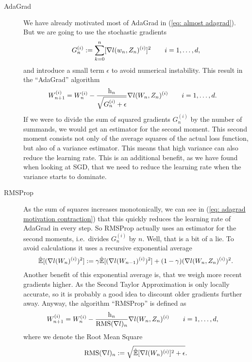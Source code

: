 \begin{description}
	\item[AdaGrad] \parencite{duchiAdaptiveSubgradientMethods2011}
	We have already motivated most of AdaGrad in (\ref{eq: almost adagrad}).
	But we are going to use the stochastic gradients
	\begin{align*}
		G_n^{(i)} := \sum_{k=0}^n [\nabla l(w_n, Z_n)^{(i)}]^2 \qquad i=1,\dots,d,
	\end{align*}
	and introduce a small term \(\epsilon\) \parencite[\(\approx 10^{-8}\)][]{ruderOverviewGradientDescent2017}
	to avoid numerical instability. This result in the ``AdaGrad'' algorithm
	\begin{align*}
		W_{n+1}^{(i)}
		&= W_n^{(i)}
		- \frac{\text{h}_n}{\sqrt{G_n^{(i)}+\epsilon}}\nabla l(W_n, Z_n)^{(i)}
		\qquad i=1,\dots,d.
	\end{align*}
	If we were to divide the sum of squared gradients \(G_n^{(i)}\) by the number
	of summands, we would get an estimator for the second moment. This second
	moment consists not only of the average squares of the actual loss function,
	but also of a variance estimator. This means that high variance can also
	reduce the learning rate. This is an additional benefit, as we have found
	when looking at SGD, that we need to reduce the learning rate when the
	variance starts to dominate.

	\item[RMSProp]\parencite[lecture 6e]{hintonNeuralNetworksMachine2012} As the sum of squares increases monotonically, we can see 
	in (\ref{eq: adagrad motivation contraction}) that this quickly reduces
	the learning rate of AdaGrad in every step. So RMSProp actually uses an
	estimator for the second moments, i.e.\ divides \(G_n^{(i)}\) by \(n\). Well,
	that is a bit of a lie. To avoid calculations it uses a recursive exponential
	average
	\begin{align*}
		\hat{\mathbb{E}}[(\nabla l(W_n)^{(i)})^2]
		:= \gamma \hat{\mathbb{E}}[(\nabla l(W_{n-1})^{(i)})^2]
		+ (1-\gamma)(\nabla l(W_n, Z_n)^{(i)})^2.
	\end{align*}
	Another benefit of this exponential average is, that we weigh more recent
	gradients higher. As the Second Taylor Approximation is only locally
	accurate, so it is probably a good idea to discount older gradients further
	away. Anyway, the algorithm ``RMSProp'' is defined as
	\begin{align*}
		W_{n+1}^{(i)}
		&= W_n^{(i)}
		- \frac{\text{h}_n}{\text{RMS}(\nabla l)_n}\nabla l(W_n, Z_n)^{(i)}
		\qquad i=1,\dots,d,
	\end{align*}
	where we denote the Root Mean Square
	\begin{align*}
		\text{RMS}(\nabla l)_n := \sqrt{\hat{\mathbb{E}}[\nabla l(W_n)^{(i)}]^2+\epsilon}.
	\end{align*}


\end{description}
